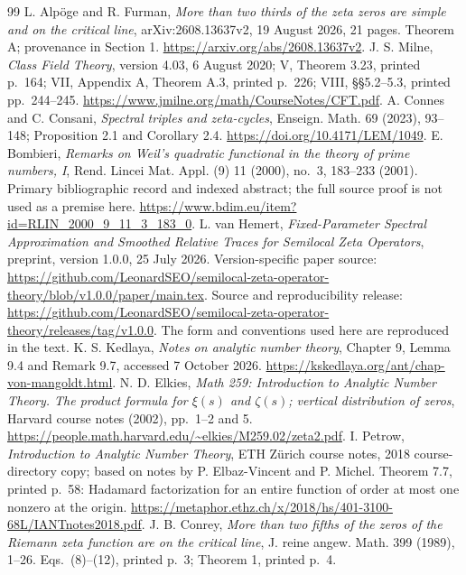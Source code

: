 \documentclass[11pt]{article}
\theoremstyle{remark}\newtheorem{remark}[theorem]{Remark}
\begin{document}
\begin{thebibliography}{99}
 L. Alp\"oge and R. Furman,
\emph{More than two thirds of the zeta zeros are simple and on the
critical line}, arXiv:2608.13637v2, 19 August 2026, 21 pages.
Theorem A; provenance in Section 1.
\url{https://arxiv.org/abs/2608.13637v2}.
 J. S. Milne, \emph{Class Field Theory},
version 4.03, 6 August 2020; V, Theorem 3.23, printed p.~164;
VII, Appendix A, Theorem A.3, printed p.~226;
VIII, \S\S5.2--5.3, printed pp.~244--245.
\url{https://www.jmilne.org/math/CourseNotes/CFT.pdf}.
 A. Connes and C. Consani,
\emph{Spectral triples and zeta-cycles},
Enseign. Math. 69 (2023), 93--148;
Proposition 2.1 and Corollary 2.4.
\url{https://doi.org/10.4171/LEM/1049}.
 E. Bombieri,
\emph{Remarks on Weil's quadratic functional in the theory of
prime numbers, I}, Rend. Lincei Mat. Appl. (9) 11 (2000), no.~3,
183--233 (2001). Primary bibliographic record and indexed abstract;
the full source proof is not used as a premise here.
\url{https://www.bdim.eu/item?id=RLIN_2000_9_11_3_183_0}.
 L. van Hemert,
\emph{Fixed-Parameter Spectral Approximation and Smoothed Relative
Traces for Semilocal Zeta Operators}, preprint, version 1.0.0,
25 July 2026.
Version-specific paper source:
\url{https://github.com/LeonardSEO/semilocal-zeta-operator-theory/blob/v1.0.0/paper/main.tex}.
Source and reproducibility release:
\url{https://github.com/LeonardSEO/semilocal-zeta-operator-theory/releases/tag/v1.0.0}.
The form and conventions used here are reproduced in the text.
 K. S. Kedlaya, \emph{Notes on analytic number theory},
Chapter 9, Lemma 9.4 and Remark 9.7, accessed 7 October 2026.
\url{https://kskedlaya.org/ant/chap-von-mangoldt.html}.
 N. D. Elkies, \emph{Math 259: Introduction to Analytic
Number Theory. The product formula for $\xi(s)$ and $\zeta(s)$; vertical
distribution of zeros}, Harvard course notes (2002), pp.~1--2 and 5.
\url{https://people.math.harvard.edu/~elkies/M259.02/zeta2.pdf}.
 I. Petrow, \emph{Introduction to Analytic Number Theory},
ETH Z\"urich course notes, 2018 course-directory copy;
based on notes by P. Elbaz-Vincent and P. Michel.
Theorem 7.7, printed p.~58: Hadamard factorization for an entire
function of order at most one nonzero at the origin.
\url{https://metaphor.ethz.ch/x/2018/hs/401-3100-68L/IANTnotes2018.pdf}.
 J. B. Conrey, \emph{More than two fifths of the zeros
of the Riemann zeta function are on the critical line},
J. reine angew. Math. 399 (1989), 1--26.
Eqs.~(8)--(12), printed p.~3; Theorem 1, printed p.~4.

\end{thebibliography}
\end{document}

